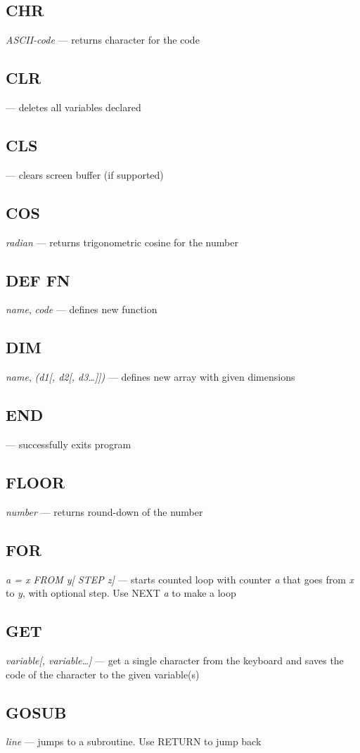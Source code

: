 \subsection{CHR} \emph{ASCII-code} --- returns character for the code
\subsection{CLR} --- deletes all variables declared
\subsection{CLS} --- clears screen buffer (if supported)
\subsection{COS} \emph{radian} --- returns trigonometric cosine for the number
\subsection{DEF FN} \emph{name}, \emph{code} --- defines new function
\subsection{DIM} \emph{name}, \emph{(d1[, d2[, d3\ldots]])} --- defines new array with given dimensions
\subsection{END} --- successfully exits program
\subsection{FLOOR} \emph{number} --- returns round-down of the number
\subsection{FOR} \emph{a = x FROM y[ STEP z]} --- starts counted loop with counter \emph{a} that goes from \emph{x} to \emph{y}, with optional step. Use NEXT \emph{a} to make a loop
\subsection{GET} \emph{variable[, variable\ldots]} --- get a single character from the keyboard and saves the code of the character to the given variable(s)
\subsection{GOSUB} \emph{line} --- jumps to a subroutine. Use RETURN to jump back
